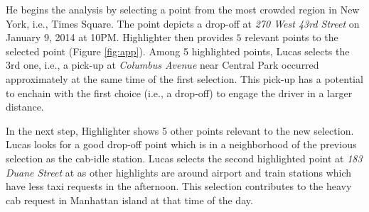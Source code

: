 He begins the analysis by selecting a point from the most crowded region in New York, i.e., Times Square. The point depicts a drop-off at {\em 270 West 43rd Street} on January 9, 2014 at 10PM. {\sc Highlighter} then provides $5$ relevant points to the selected point (Figure \ref{fig:app}).
Among 5 highlighted points, Lucas selects the 3rd one, i.e., a pick-up at {\em Columbus Avenue} near Central Park occurred approximately at the same time of the first selection. This pick-up has a potential to enchain with the first choice (i.e., a drop-off) to engage the driver in a larger distance.

In the next step, {\sc Highlighter} shows 5 other points relevant to the new selection. Lucas looks for a good drop-off point which is in a neighborhood of the previous selection as the cab-idle station. Lucas selects the second highlighted point at {\em 183 Duane Street} at  as other highlights are around airport and train stations which have less taxi requests in the afternoon. This selection contributes to the heavy cab request in Manhattan island at that time of the day. 


